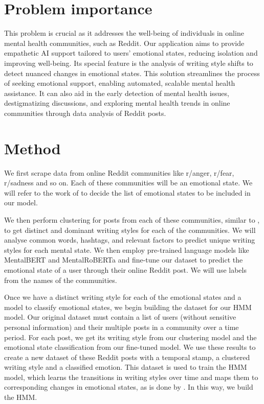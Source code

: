\documentclass[conference,compsoc]{IEEEtran}
\begin{document}
\section{Problem importance}
This problem is crucial as it addresses the well-being of individuals in online mental health communities, such as Reddit. Our application aims to provide empathetic AI support tailored to users' emotional states, reducing isolation and improving well-being. Its special feature is the analysis of writing style shifts to detect nuanced changes in emotional states. This solution streamlines the process of seeking emotional support, enabling automated, scalable mental health assistance. It can also aid in the early detection of mental health issues, destigmatizing discussions, and exploring mental health trends in online communities through data analysis of Reddit posts.

\section{Method}
We first scrape data from online Reddit communities like r/anger, r/fear, r/sadness and so on. Each of these communities will be an emotional state. We will refer to the work of \citet{Plutchik+Kellerman-13:emotion} to decide the list of emotional states to be included in our model. 

We then perform clustering for posts from each of these communities, similar to \citet{Park+18:mental-health-reddit}, to get distinct and dominant writing styles for each of the communities. We will analyse common words, hashtags, and relevant factors to predict unique writing styles for each mental state. We then employ pre-trained language models like MentalBERT and MentalRoBERTa \citep{Ji+21:MentalBERT} and fine-tune our dataset to predict the emotional state of a user through their online Reddit post. We will use labels from the names of the communities. 

Once we have a distinct writing style for each of the emotional states and a model to classify emotional states, we begin building the dataset for our HMM model. Our original dataset must contain a list of users (without sensitive personal information) and their multiple posts in a community over a time period. For each post, we get its writing style from our clustering model and the emotional state classification from our fine-tuned model. We use these results to create a new dataset of these Reddit posts with a temporal stamp, a clustered writing style and a classified emotion. This dataset is used to train the HMM model, which learns the transitions in writing styles over time and maps them to corresponding changes in emotional states, as is done by \citet{Ansari+18:dcr-hmm}. In this way, we build the HMM. 
\end{document}
